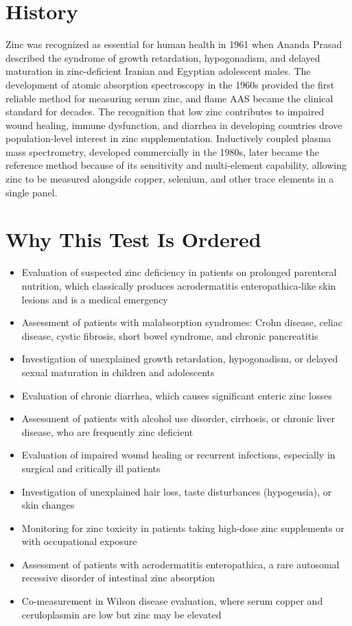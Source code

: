 \section*{History}
Zinc was recognized as essential for human health in 1961 when Ananda Prasad described the syndrome of growth retardation, hypogonadism, and delayed maturation in zinc-deficient Iranian and Egyptian adolescent males. The development of atomic absorption spectroscopy in the 1960s provided the first reliable method for measuring serum zinc, and flame AAS became the clinical standard for decades. The recognition that low zinc contributes to impaired wound healing, immune dysfunction, and diarrhea in developing countries drove population-level interest in zinc supplementation. Inductively coupled plasma mass spectrometry, developed commercially in the 1980s, later became the reference method because of its sensitivity and multi-element capability, allowing zinc to be measured alongside copper, selenium, and other trace elements in a single panel.

\section*{Why This Test Is Ordered}
\begin{itemize}
  \item Evaluation of suspected zinc deficiency in patients on prolonged parenteral nutrition, which classically produces acrodermatitis enteropathica-like skin lesions and is a medical emergency
  \item Assessment of patients with malabsorption syndromes: Crohn disease, celiac disease, cystic fibrosis, short bowel syndrome, and chronic pancreatitis
  \item Investigation of unexplained growth retardation, hypogonadism, or delayed sexual maturation in children and adolescents
  \item Evaluation of chronic diarrhea, which causes significant enteric zinc losses
  \item Assessment of patients with alcohol use disorder, cirrhosis, or chronic liver disease, who are frequently zinc deficient
  \item Evaluation of impaired wound healing or recurrent infections, especially in surgical and critically ill patients
  \item Investigation of unexplained hair loss, taste disturbances (hypogeusia), or skin changes
  \item Monitoring for zinc toxicity in patients taking high-dose zinc supplements or with occupational exposure
  \item Assessment of patients with acrodermatitis enteropathica, a rare autosomal recessive disorder of intestinal zinc absorption
  \item Co-measurement in Wilson disease evaluation, where serum copper and ceruloplasmin are low but zinc may be elevated
\end{itemize}

